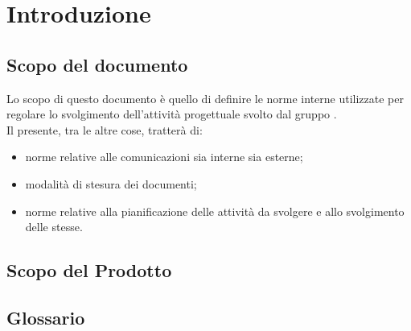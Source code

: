 \section{Introduzione}

\subsection{Scopo del documento}

Lo scopo di questo documento è quello di definire le norme interne utilizzate per regolare lo svolgimento dell'attività progettuale \ProjectName\space svolto dal gruppo \GroupName.\\
Il presente, tra le altre cose, tratterà di:
\begin{itemize}
	\item norme relative alle comunicazioni sia interne sia esterne;
\item modalità di stesura dei documenti;
\item norme relative alla pianificazione delle attività da svolgere e allo svolgimento delle stesse.
\end{itemize}

\subsection{Scopo del Prodotto}
\ScopoDelProdotto

\subsection{Glossario}
\GlossarioIntroduzione






